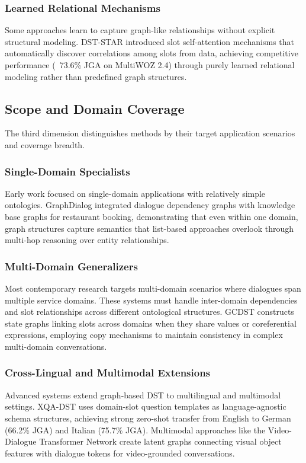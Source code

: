 \documentclass[11pt]{article}
\begin{document}
\subsubsection{Learned Relational Mechanisms}
Some approaches learn to capture graph-like relationships without explicit structural modeling. DST-STAR \citep{Ye2021STAR} introduced slot self-attention mechanisms that automatically discover correlations among slots from data, achieving competitive performance (~73.6\% JGA on MultiWOZ 2.4) through purely learned relational modeling rather than predefined graph structures.

\subsection{Scope and Domain Coverage}

The third dimension distinguishes methods by their target application scenarios and coverage breadth.

\subsubsection{Single-Domain Specialists}
Early work focused on single-domain applications with relatively simple ontologies. GraphDialog \citep{Zhang2020GraphDialog} integrated dialogue dependency graphs with knowledge base graphs for restaurant booking, demonstrating that even within one domain, graph structures capture semantics that list-based approaches overlook through multi-hop reasoning over entity relationships.

\subsubsection{Multi-Domain Generalizers}
Most contemporary research targets multi-domain scenarios where dialogues span multiple service domains. These systems must handle inter-domain dependencies and slot relationships across different ontological structures. GCDST \citep{Wu2020GCDST} constructs state graphs linking slots across domains when they share values or coreferential expressions, employing copy mechanisms to maintain consistency in complex multi-domain conversations.

\subsubsection{Cross-Lingual and Multimodal Extensions}
Advanced systems extend graph-based DST to multilingual and multimodal settings. XQA-DST \citep{Zhou2023XQADST} uses domain-slot question templates as language-agnostic schema structures, achieving strong zero-shot transfer from English to German (66.2\% JGA) and Italian (75.7\% JGA). Multimodal approaches like the Video-Dialogue Transformer Network \citep{Le2022MultimodalDST} create latent graphs connecting visual object features with dialogue tokens for video-grounded conversations.
\end{document}
